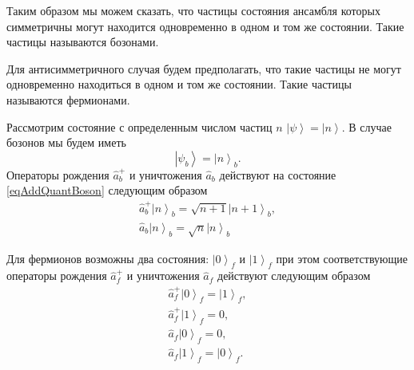 Таким образом мы можем сказать, что частицы
состояния ансамбля которых симметричны могут находится одновременно в
одном и том же состоянии. Такие частицы называются бозонами.

Для антисимметричного случая будем  
предполагать, что такие частицы не могут одновременно находиться в
одном и том же состоянии. Такие частицы называются фермионами.

Рассмотрим состояние с определенным числом частиц $n$
$\left|\psi\right> = \left|n\right>$. В случае бозонов мы будем иметь 
\begin{equation}
\left|\psi_b\right> = \left|n\right>_b.
\label{eqAddQuantBoson}
\end{equation}
Операторы рождения $\hat{a}_b^{+}$ и уничтожения $\hat{a}_b$ действуют на
состояние \eqref{eqAddQuantBoson} следующим образом
\begin{eqnarray}
\hat{a}_b^{+}\left|n\right>_b = \sqrt{n+1}\left|n+1\right>_b, 
\nonumber \\
\hat{a}_b\left|n\right>_b = \sqrt{n}\left|n\right>_b
\nonumber
\end{eqnarray}

Для фермионов возможны два состояния: $\left|0\right>_f$ и
$\left|1\right>_f$ при этом соответствующие операторы рождения
$\hat{a}_f^{+}$ и уничтожения $\hat{a}_f$ действуют следующим образом
\begin{eqnarray}
\hat{a}_f^{+}\left|0\right>_f = \left|1\right>_f, 
\nonumber \\
\hat{a}_f^{+}\left|1\right>_f = 0, 
\nonumber \\
\hat{a}_f\left|0\right>_f = 0, 
\nonumber \\
\hat{a}_f\left|1\right>_f = \left|0\right>_f.
\nonumber
\end{eqnarray}
